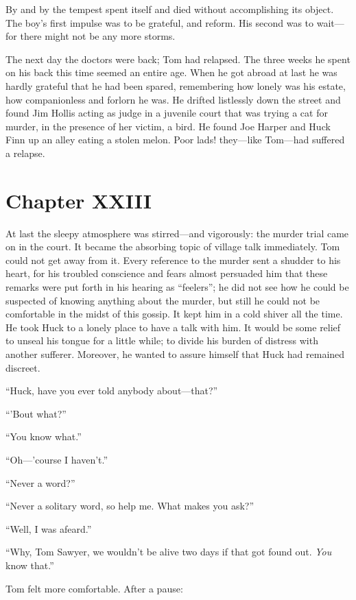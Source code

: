 \documentclass{book}
\begin{document}
By and by the tempest spent itself and died without accomplishing its object. The boy’s first impulse was to be grateful, and reform. His second was to wait—for there might not be any more storms.

The next day the doctors were back; Tom had relapsed. The three weeks he spent on his back this time seemed an entire age. When he got abroad at last he was hardly grateful that he had been spared, remembering how lonely was his estate, how companionless and forlorn he was. He drifted listlessly down the street and found Jim Hollis acting as judge in a juvenile court that was trying a cat for murder, in the presence of her victim, a bird. He found Joe Harper and Huck Finn up an alley eating a stolen melon. Poor lads! they—like Tom—had suffered a relapse.

\chapter*{Chapter XXIII}

At last the sleepy atmosphere was stirred—and vigorously: the murder trial came on in the court. It became the absorbing topic of village talk immediately. Tom could not get away from it. Every reference to the murder sent a shudder to his heart, for his troubled conscience and fears almost persuaded him that these remarks were put forth in his hearing as “feelers”; he did not see how he could be suspected of knowing anything about the murder, but still he could not be comfortable in the midst of this gossip. It kept him in a cold shiver all the time. He took Huck to a lonely place to have a talk with him. It would be some relief to unseal his tongue for a little while; to divide his burden of distress with another sufferer. Moreover, he wanted to assure himself that Huck had remained discreet.

“Huck, have you ever told anybody about—that?”

“’Bout what?”

“You know what.”

“Oh—’course I haven’t.”

“Never a word?”

“Never a solitary word, so help me. What makes you ask?”

“Well, I was afeard.”

“Why, Tom Sawyer, we wouldn’t be alive two days if that got found out. \emph{You} know that.”

Tom felt more comfortable. After a pause:
\end{document}
